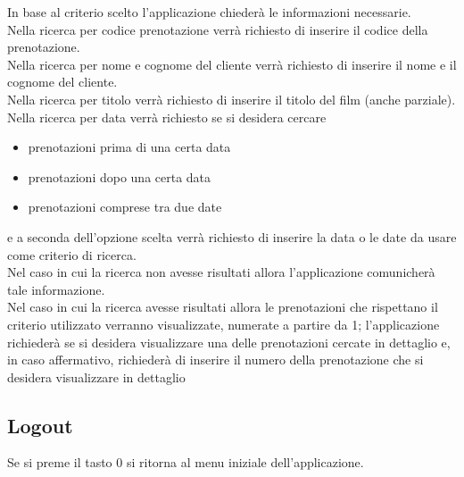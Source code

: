 \documentclass[a4paper, 12pt, titlepage, openany]{book}
\begin{document}
In base al criterio scelto l’applicazione chiederà le informazioni necessarie. \\

Nella ricerca per codice prenotazione verrà richiesto di inserire il codice della prenotazione. \\

Nella ricerca per nome e cognome del cliente verrà richiesto di inserire il nome e il cognome del cliente. \\

Nella ricerca per titolo verrà richiesto di inserire il titolo del film (anche parziale). \\

Nella ricerca per data verrà richiesto se si desidera cercare

\begin{center}
\begin{varwidth}{\textwidth}
\begin{itemize}
\item[•] prenotazioni prima di una certa data  
\item[•] prenotazioni dopo una certa data  
\item[•] prenotazioni comprese tra due date 
\end{itemize}
\end{varwidth}
\end{center}

e a seconda dell’opzione scelta verrà richiesto di inserire la data o le date da usare come criterio di ricerca. \\

Nel caso in cui la ricerca non avesse risultati allora l’applicazione comunicherà tale informazione. \\

Nel caso in cui la ricerca avesse risultati allora le prenotazioni che rispettano il criterio utilizzato verranno visualizzate, numerate a partire da 1; l’applicazione richiederà se si desidera visualizzare una delle prenotazioni cercate in dettaglio e, in caso affermativo, richiederà di inserire il numero della prenotazione che si desidera visualizzare in dettaglio 

\subsection{Logout}
Se si preme il tasto 0 si ritorna al menu iniziale dell'applicazione.
\end{document}
